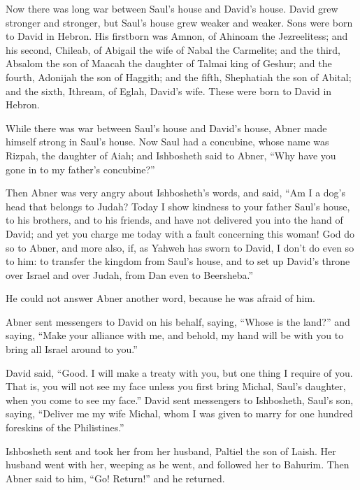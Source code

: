 Now there was long war between Saul's house and David's
house. David grew stronger and stronger, but Saul's house grew weaker
and weaker.  Sons were born to David in Hebron. His
firstborn was Amnon, of Ahinoam the Jezreelitess;  and his
second, Chileab, of Abigail the wife of Nabal the Carmelite; and the
third, Absalom the son of Maacah the daughter of Talmai king of Geshur;
 and the fourth, Adonijah the son of Haggith; and the
fifth, Shephatiah the son of Abital;  and the sixth,
Ithream, of Eglah, David's wife. These were born to David in Hebron.

 While there was war between Saul's house and David's
house, Abner made himself strong in Saul's house.  Now
Saul had a concubine, whose name was Rizpah, the daughter of Aiah; and
Ishbosheth said to Abner, ``Why have you gone in to my father's
concubine?''

 Then Abner was very angry about Ishbosheth's words, and
said, ``Am I a dog's head that belongs to Judah? Today I show kindness
to your father Saul's house, to his brothers, and to his friends, and
have not delivered you into the hand of David; and yet you charge me
today with a fault concerning this woman!  God do so to
Abner, and more also, if, as Yahweh has sworn to David, I don't do even
so to him:  to transfer the kingdom from Saul's house,
and to set up David's throne over Israel and over Judah, from Dan even
to Beersheba.''

 He could not answer Abner another word, because he was
afraid of him.

 Abner sent messengers to David on his behalf, saying,
``Whose is the land?'' and saying, ``Make your alliance with me, and
behold, my hand will be with you to bring all Israel around to you.''

 David said, ``Good. I will make a treaty with you, but
one thing I require of you. That is, you will not see my face unless you
first bring Michal, Saul's daughter, when you come to see my face.''
 David sent messengers to Ishbosheth, Saul's son, saying,
``Deliver me my wife Michal, whom I was given to marry for one hundred
foreskins of the Philistines.''

 Ishbosheth sent and took her from her husband, Paltiel
the son of Laish.  Her husband went with her, weeping as
he went, and followed her to Bahurim. Then Abner said to him, ``Go!
Return!'' and he returned.

